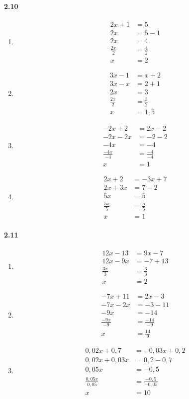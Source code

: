 \documentclass{article}
\newcommand\litem[1]{\item{\bfseries#1\space}}
\begin{document}
\paragraph{2.10}
\begin{enumerate}[label=\emph{\alph*})]
\litem{
\begin{align*}
  2x + 1 &= 5 \\
  2x &= 5 - 1 \\
  2x &= 4 \\ \frac{2x}{2} &= \frac{4}{2} \\ x &= 2
 \end{align*}
}
\litem{
\begin{align*}
  3x - 1 &= x + 2 \\
  3x - x &= 2 + 1 \\
  2x &= 3 \\
  \frac{2x}{2} &= \frac{3}{2} \\
  x &= 1,5
\end{align*}
}
\litem{
\begin{align*}
  -2x + 2 &= 2x - 2 \\
  -2x - 2x &= -2 - 2 \\
  -4x &= -4 \\
  \frac{-4x}{-4} &= \frac{-4}{-4} \\
  x &= 1 
\end{align*}
}
\litem{
\begin{align*}
  2x + 2 &= -3x + 7 \\
  2x + 3x &= 7 - 2 \\
  5x &= 5 \\
  \frac{5x}{5} &= \frac{5}{5} \\
  x &= 1
\end{align*}
}
\end{enumerate}

\paragraph{2.11}
\begin{enumerate}[label=\emph{\alph*})]
\litem{
\begin{align*}
  12x - 13 &= 9x - 7 \\
  12x - 9x &= -7 + 13 \\
  \frac{3x}{3} &= \frac{6}{3} \\
  x &= 2
 \end{align*}
}
\litem{
\begin{align*}
  -7x + 11 &= 2x - 3 \\
  -7x - 2x &= -3 - 11 \\
  -9x &= -14 \\
  \frac{-9x}{-9} &= \frac{-14}{-9} \\
  x &= \frac{14}{9}
\end{align*}
}
\litem{
\begin{align*}
  0,02x + 0,7 &= -0,03x + 0,2 \\
  0,02x + 0,03x &= 0,2 - 0,7 \\
  0,05x &= -0,5 \\
  \frac{0,05x}{0,05} &= \frac{-0,5}{-0,05} \\
  x &= 10
\end{align*}
}
\end{enumerate}
\end{document}
